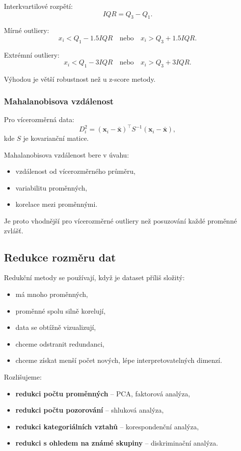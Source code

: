 Interkvartilové rozpětí:
\[
IQR = Q_3-Q_1.
\]

Mírné outliery:
\[
x_i < Q_1 - 1.5IQR
\quad \text{nebo} \quad
x_i > Q_3 + 1.5IQR.
\]

Extrémní outliery:
\[
x_i < Q_1 - 3IQR
\quad \text{nebo} \quad
x_i > Q_3 + 3IQR.
\]

Výhodou je větší robustnost než u z-score metody.

\subsubsection{Mahalanobisova vzdálenost}

Pro vícerozměrná data:
\[
D_i^2
=
(\mathbf{x}_i-\bar{\mathbf{x}})^\top
S^{-1}
(\mathbf{x}_i-\bar{\mathbf{x}}),
\]
kde $S$ je kovarianční matice.

Mahalanobisova vzdálenost bere v úvahu:
\begin{itemize}
    \item vzdálenost od vícerozměrného průměru,
    \item variabilitu proměnných,
    \item korelace mezi proměnnými.
\end{itemize}

Je proto vhodnější pro vícerozměrné outliery než posuzování každé proměnné zvlášť.

\subsection{Redukce rozměru dat}

Redukční metody se používají, když je dataset příliš složitý:
\begin{itemize}
    \item má mnoho proměnných,
    \item proměnné spolu silně korelují,
    \item data se obtížně vizualizují,
    \item chceme odstranit redundanci,
    \item chceme získat menší počet nových, lépe interpretovatelných dimenzí.
\end{itemize}

Rozlišujeme:
\begin{itemize}
    \item \textbf{redukci počtu proměnných} -- PCA, faktorová analýza,
    \item \textbf{redukci počtu pozorování} -- shluková analýza,
    \item \textbf{redukci kategoriálních vztahů} -- korespondenční analýza,
    \item \textbf{redukci s ohledem na známé skupiny} -- diskriminační analýza.
\end{itemize}

